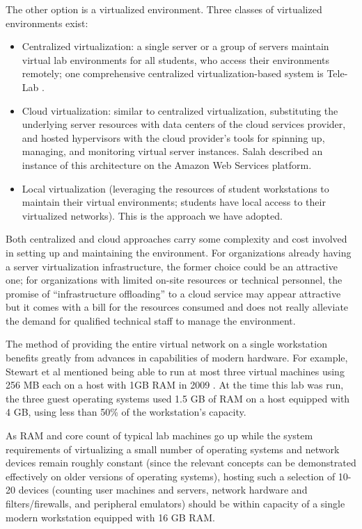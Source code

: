 \documentclass{sig-alternate-2013}
\begin{document}
The other option is a virtualized environment. Three classes of virtualized environments exist: 
\begin{itemize}
\item Centralized virtualization: a single server or a group of servers maintain virtual lab environments for all students, 
who access their environments remotely; one comprehensive centralized virtualization-based system is Tele-Lab \cite{willems2008tele}. 
\item Cloud virtualization: similar to centralized virtualization, substituting the underlying server resources with
data centers of the cloud services provider, and hosted hypervisors with the cloud provider's tools for spinning up, 
managing, and monitoring virtual server instances.  Salah \cite{salah2014harnessing} described an instance of this 
architecture on the Amazon Web Services platform.
\item Local virtualization (leveraging the resources of student workstations to maintain their virtual environments;
students have local access to their virtualized networks). This is the approach we have adopted.
\end{itemize}

Both centralized and cloud approaches carry some complexity and cost involved in setting up and maintaining the
environment. For organizations already having a server virtualization infrastructure, the former choice could be an attractive 
one; for organizations with limited on-site resources or technical personnel, the promise of ``infrastructure offloading''
to a cloud service may appear attractive but it comes with a bill for the resources consumed and does not really alleviate 
the demand for qualified technical staff to manage the environment.

The method of providing the entire virtual network on a single workstation benefits greatly from advances in
capabilities of modern hardware. For example, Stewart et al mentioned being able to run at most three virtual machines
using 256 MB each on a host with 1GB RAM in 2009 \cite{virtplatform}. At the time this lab was run, the three guest operating systems 
used 1.5 GB of RAM on a host equipped with 4 GB, using less than 50\% of the workstation's capacity. 

As RAM and core count of typical lab 
machines go up while the system requirements of virtualizing a small number of operating systems
and network devices remain roughly constant (since the relevant concepts can be demonstrated effectively on older
versions of operating systems), hosting such a selection of 10-20 devices (counting user machines and servers,
network hardware and filters/firewalls, and peripheral emulators) should be within capacity of a single modern  
workstation equipped with 16 GB RAM.
\end{document}
